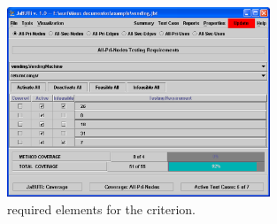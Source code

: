 \begin{figure}[!ht]
\begin{center}
\includegraphics[width=0.70\textwidth]{fig/required-elements.eps}
\caption{\label{fig:requirements} 
required elements for the  criterion.}
\end{center}
\end{figure}
